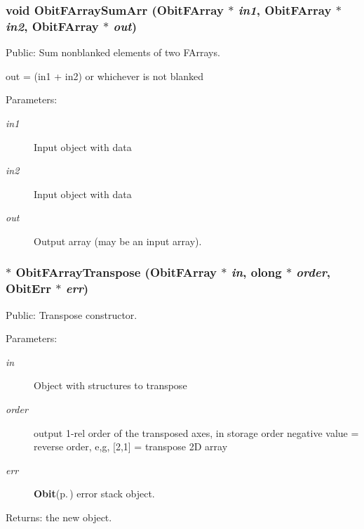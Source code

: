 \subsubsection{\setlength{\rightskip}{0pt plus 5cm}void Obit\-FArray\-Sum\-Arr ({\bf Obit\-FArray} $\ast$ {\em in1}, {\bf Obit\-FArray} $\ast$ {\em in2}, {\bf Obit\-FArray} $\ast$ {\em out})}\label{ObitFArray_8h_a91}


Public: Sum nonblanked elements of two FArrays. 

out = (in1 + in2) or whichever is not blanked \begin{Desc}
\item[Parameters:]
\begin{description}
\item[{\em in1}]Input object with data \item[{\em in2}]Input object with data \item[{\em out}]Output array (may be an input array). \end{description}
\end{Desc}
\subsubsection{$\ast$ Obit\-FArray\-Transpose ({\bf Obit\-FArray} $\ast$ {\em in}, {\bf olong} $\ast$ {\em order}, {\bf Obit\-Err} $\ast$ {\em err})}\label{ObitFArray_8h_a61}


Public: Transpose constructor. 

\begin{Desc}
\item[Parameters:]
\begin{description}
\item[{\em in}]Object with structures to transpose \item[{\em order}]output 1-rel order of the transposed axes, in storage order negative value = reverse order, e,g, [2,1] = transpose 2D array \item[{\em err}]{\bf Obit}{\rm (p.\,\pageref{structObit})} error stack object. \end{description}
\end{Desc}
\begin{Desc}
\item[Returns:]the new object. \end{Desc}

